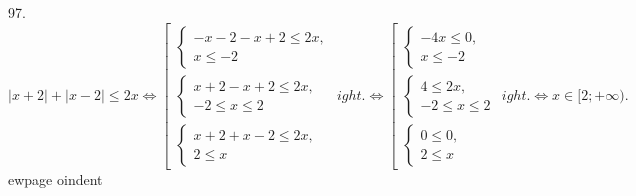 97. $|x+2|+|x-2|\leqslant2x\Leftrightarrow\left[\begin{array}{l}\begin{cases}-x-2-x+2\leqslant2x,\\ x\leqslant-2\end{cases}\\
\begin{cases}x+2-x+2\leqslant2x,\\ -2\leqslant x \leqslant 2\end{cases}\\
\begin{cases}x+2+x-2\leqslant2x,\\ 2\leqslant x \end{cases}
\end{array}
ight.\Leftrightarrow\left[\begin{array}{l}\begin{cases}-4x\leqslant0,\\ x\leqslant-2\end{cases}\\
\begin{cases}4\leqslant2x,\\ -2\leqslant x \leqslant 2\end{cases}\\
\begin{cases}0\leqslant0,\\ 2\leqslant x \end{cases}
\end{array}
ight.\Leftrightarrow x\in[2;+\infty).$
ewpage
oindent
